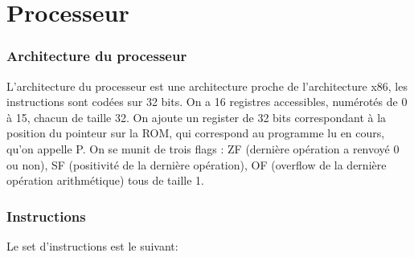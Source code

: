\documentclass{article}
\begin{document}
\part*{Processeur}

\section*{Architecture du processeur}

L'architecture du processeur est une architecture proche de l'architecture x86,
les instructions sont codées sur 32 bits. On a 16 registres accessibles,
numérotés de 0 à 15, chacun de taille 32. On ajoute un register de 32
bits correspondant à la position du pointeur sur la ROM, qui correspond
au programme lu en cours, qu'on appelle P.
On se munit de trois flags : ZF (dernière opération a renvoyé 0 ou non), SF
(positivité de la dernière opération), OF (overflow de la dernière
opération arithmétique) tous de taille 1.


\section*{Instructions}
 
Le set d'instructions est le suivant:
\end{document}
